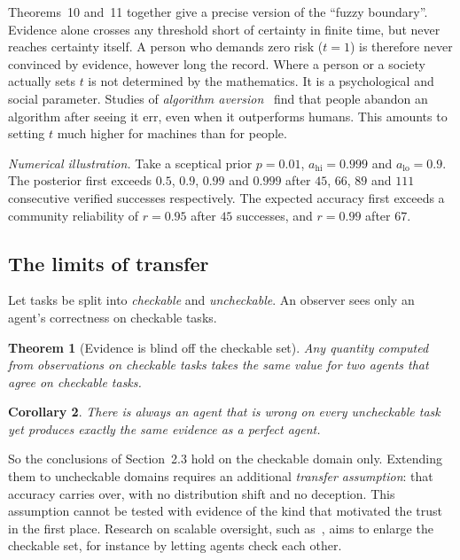 \documentclass[11pt]{article}
\newtheorem{theorem}{Theorem}
\newtheorem{corollary}[theorem]{Corollary}
\theoremstyle{definition}
\theoremstyle{remark}
\begin{document}
Theorems~10 and~11 together give a precise version of the ``fuzzy boundary''. Evidence alone
crosses any threshold short of certainty in finite time, but never reaches certainty itself. A
person who demands zero risk ($t=1$) is therefore never convinced by evidence, however long the
record. Where a person or a society actually sets $t$ is not determined by the mathematics. It
is a psychological and social parameter. Studies of \emph{algorithm aversion}~\cite{dietvorst}
find that people abandon an algorithm after seeing it err, even when it outperforms humans.
This amounts to setting $t$ much higher for machines than for people.

\emph{Numerical illustration.} Take a sceptical prior $p = 0.01$, $a_{\mathrm{hi}} = 0.999$ and
$a_{\mathrm{lo}} = 0.9$. The posterior first exceeds $0.5$, $0.9$, $0.99$ and $0.999$ after
$45$, $66$, $89$ and $111$ consecutive verified successes respectively. The expected accuracy
first exceeds a community reliability of $r=0.95$ after $45$ successes, and $r=0.99$ after
$67$.

\subsection{The limits of transfer}

Let tasks be split into \emph{checkable} and \emph{uncheckable}. An observer sees only an
agent's correctness on checkable tasks.

\begin{theorem}[Evidence is blind off the checkable set]
Any quantity computed from observations on checkable tasks takes the same value for two agents
that agree on checkable tasks.
\end{theorem}

\begin{corollary}
There is always an agent that is wrong on every uncheckable task yet produces exactly the same
evidence as a perfect agent.
\end{corollary}

So the conclusions of Section~2.3 hold on the checkable domain only. Extending them to
uncheckable domains requires an additional \emph{transfer assumption}: that accuracy carries
over, with no distribution shift and no deception. This assumption cannot be tested with
evidence of the kind that motivated the trust in the first place. Research on scalable
oversight, such as~\cite{debate}, aims to enlarge the checkable set, for instance by letting
agents check each other.
\end{document}
